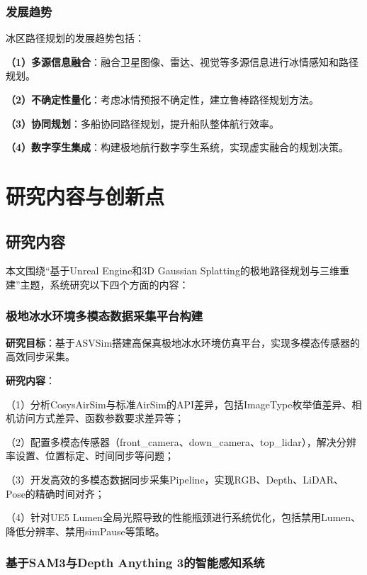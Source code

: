 \documentclass[12pt,a4paper]{ctexbook}
\begin{document}
\subsubsection{发展趋势}

冰区路径规划的发展趋势包括：

\textbf{（1）多源信息融合}：融合卫星图像、雷达、视觉等多源信息进行冰情感知和路径规划。

\textbf{（2）不确定性量化}：考虑冰情预报不确定性，建立鲁棒路径规划方法。

\textbf{（3）协同规划}：多船协同路径规划，提升船队整体航行效率。

\textbf{（4）数字孪生集成}：构建极地航行数字孪生系统，实现虚实融合的规划决策。

\section{研究内容与创新点}

\subsection{研究内容}

本文围绕``基于Unreal Engine和3D Gaussian Splatting的极地路径规划与三维重建''主题，系统研究以下四个方面的内容：

\subsubsection{极地冰水环境多模态数据采集平台构建}

\textbf{研究目标}：基于ASVSim搭建高保真极地冰水环境仿真平台，实现多模态传感器的高效同步采集。

\textbf{研究内容}：

（1）分析CosysAirSim与标准AirSim的API差异，包括ImageType枚举值差异、相机访问方式差异、函数参数要求差异等；

（2）配置多模态传感器（front_camera、down_camera、top_lidar），解决分辨率设置、位置标定、时间同步等问题；

（3）开发高效的多模态数据同步采集Pipeline，实现RGB、Depth、LiDAR、Pose的精确时间对齐；

（4）针对UE5 Lumen全局光照导致的性能瓶颈进行系统优化，包括禁用Lumen、降低分辨率、禁用simPause等策略。

\subsubsection{基于SAM3与Depth Anything 3的智能感知系统}
\end{document}
